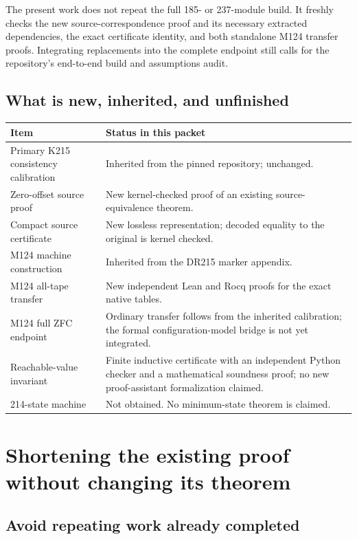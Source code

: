 \documentclass[11pt]{article}
\theoremstyle{remark}\newtheorem{remark}[theorem]{Remark}
\begin{document}
The present work does not repeat the full 185- or 237-module build. It freshly checks the new source-correspondence proof and its necessary extracted dependencies, the exact certificate identity, and both standalone M124 transfer proofs. Integrating replacements into the complete endpoint still calls for the repository's end-to-end build and assumptions audit.

\subsection{What is new, inherited, and unfinished}

\begin{center}
\begin{tabularx}{\linewidth}{p{.29\linewidth}Y}
\toprule
Item & Status in this packet \\
\midrule
Primary K215 consistency calibration & Inherited from the pinned repository; unchanged. \\
Zero-offset source proof & New kernel-checked proof of an existing source-equivalence theorem. \\
Compact source certificate & New lossless representation; decoded equality to the original is kernel checked. \\
M124 machine construction & Inherited from the DR215 marker appendix. \\
M124 all-tape transfer & New independent Lean and Rocq proofs for the exact native tables. \\
M124 full ZFC endpoint & Ordinary transfer follows from the inherited calibration; the formal configuration-model bridge is not yet integrated. \\
Reachable-value invariant & Finite inductive certificate with an independent Python checker and a mathematical soundness proof; no new proof-assistant formalization claimed. \\
214-state machine & Not obtained. No minimum-state theorem is claimed. \\
\bottomrule
\end{tabularx}
\end{center}

\section{Shortening the existing proof without changing its theorem}

\subsection{Avoid repeating work already completed}
\end{document}

